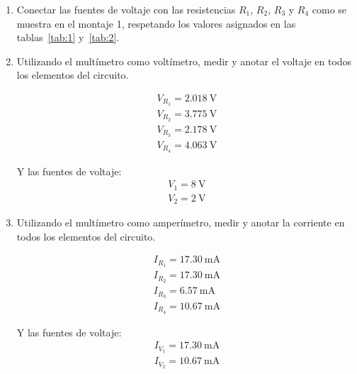 \documentclass{article}
\begin{document}
    
    \begin{enumerate}
        \subsection{Teorema de Tellegen}

        \item Conectar las fuentes de voltaje con las resistencias $R_1$, $R_2$, $R_3$ y $R_4$ como se muestra en el montaje 1, respetando los valores asignados en las tablas~\ref{tab:1} y~\ref{tab:2}.
        

        \item Utilizando el multímetro como voltímetro, medir y anotar el voltaje en todos los elementos del circuito.
        
        \begin{align*}
            V_{R_1} = \SI{2.018}{\volt}\\
            V_{R_2} = \SI{3.775}{\volt}\\
            V_{R_3} = \SI{2.178}{\volt}\\
            V_{R_4} = \SI{4.063}{\volt}
        \end{align*}

        Y las fuentes de voltaje:
        \begin{align*}
            V_{1} = \SI{8}{\volt}\\
            V_{2} = \SI{2}{\volt}
        \end{align*}

        \item Utilizando el multímetro como amperímetro, medir y anotar la corriente en todos los elementos del circuito.
        
        \begin{align*}
            I_{R_1} = \SI{17.30}{\milli\ampere}\\
            I_{R_2} = \SI{17.30}{\milli\ampere}\\
            I_{R_3} = \SI{6.57}{\milli\ampere}\\
            I_{R_4} = \SI{10.67}{\milli\ampere}
        \end{align*}

        Y las fuentes de voltaje:
        \begin{align*}
            I_{V_1} = \SI{17.30}{\milli\ampere}\\
            I_{V_2} = \SI{10.67}{\milli\ampere}
        \end{align*}


\end{enumerate}
\end{document}
